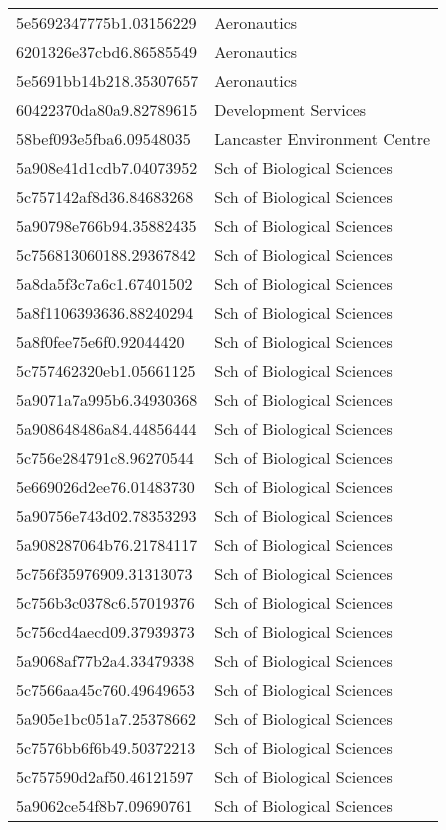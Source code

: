 \begin{tabular}{ll}
5e5692347775b1.03156229 & Aeronautics \\
6201326e37cbd6.86585549 & Aeronautics \\
5e5691bb14b218.35307657 & Aeronautics \\
60422370da80a9.82789615 & Development Services \\
58bef093e5fba6.09548035 & Lancaster Environment Centre \\
5a908e41d1cdb7.04073952 & Sch of Biological Sciences \\
5c757142af8d36.84683268 & Sch of Biological Sciences \\
5a90798e766b94.35882435 & Sch of Biological Sciences \\
5c756813060188.29367842 & Sch of Biological Sciences \\
5a8da5f3c7a6c1.67401502 & Sch of Biological Sciences \\
5a8f1106393636.88240294 & Sch of Biological Sciences \\
5a8f0fee75e6f0.92044420 & Sch of Biological Sciences \\
5c757462320eb1.05661125 & Sch of Biological Sciences \\
5a9071a7a995b6.34930368 & Sch of Biological Sciences \\
5a908648486a84.44856444 & Sch of Biological Sciences \\
5c756e284791c8.96270544 & Sch of Biological Sciences \\
5e669026d2ee76.01483730 & Sch of Biological Sciences \\
5a90756e743d02.78353293 & Sch of Biological Sciences \\
5a908287064b76.21784117 & Sch of Biological Sciences \\
5c756f35976909.31313073 & Sch of Biological Sciences \\
5c756b3c0378c6.57019376 & Sch of Biological Sciences \\
5c756cd4aecd09.37939373 & Sch of Biological Sciences \\
5a9068af77b2a4.33479338 & Sch of Biological Sciences \\
5c7566aa45c760.49649653 & Sch of Biological Sciences \\
5a905e1bc051a7.25378662 & Sch of Biological Sciences \\
5c7576bb6f6b49.50372213 & Sch of Biological Sciences \\
5c757590d2af50.46121597 & Sch of Biological Sciences \\
5a9062ce54f8b7.09690761 & Sch of Biological Sciences \\

\end{tabular}
